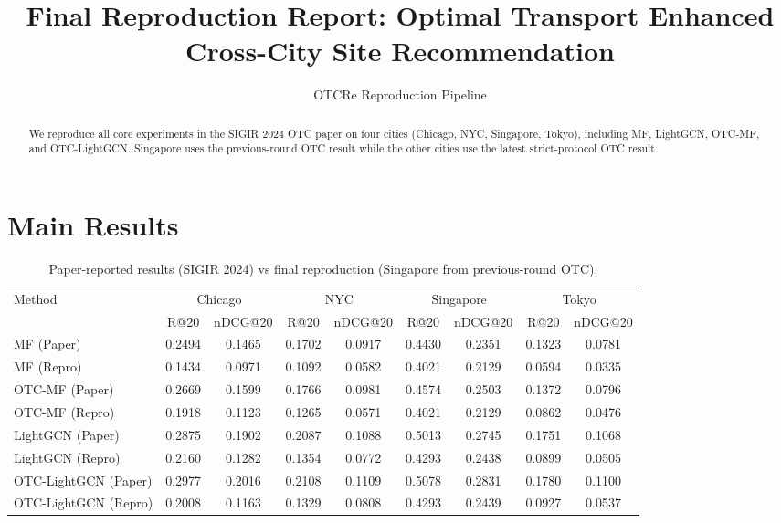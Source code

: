 \documentclass[10pt]{article}
\title{Final Reproduction Report: Optimal Transport Enhanced Cross-City Site Recommendation}
\author{OTCRe Reproduction Pipeline}
\date{}
\begin{document}
\maketitle

\begin{abstract}
We reproduce all core experiments in the SIGIR 2024 OTC paper on four cities (Chicago, NYC, Singapore, Tokyo), including MF, LightGCN, OTC-MF, and OTC-LightGCN. Singapore uses the previous-round OTC result while the other cities use the latest strict-protocol OTC result.
\end{abstract}

\section{Main Results}
\begin{table}[t]
\centering
\caption{Paper-reported results (SIGIR 2024) vs final reproduction (Singapore from previous-round OTC).}
\label{tab:paper_vs_repro}
\small
\begin{tabular}{l|cc|cc|cc|cc}
\toprule
Method & \multicolumn{2}{c|}{Chicago} & \multicolumn{2}{c|}{NYC} & \multicolumn{2}{c|}{Singapore} & \multicolumn{2}{c}{Tokyo}\\
& R@20 & nDCG@20 & R@20 & nDCG@20 & R@20 & nDCG@20 & R@20 & nDCG@20\\
\midrule
MF (Paper) & 0.2494 & 0.1465 & 0.1702 & 0.0917 & 0.4430 & 0.2351 & 0.1323 & 0.0781\\
MF (Repro) & 0.1434 & 0.0971 & 0.1092 & 0.0582 & 0.4021 & 0.2129 & 0.0594 & 0.0335\\
\midrule
OTC-MF (Paper) & 0.2669 & 0.1599 & 0.1766 & 0.0981 & 0.4574 & 0.2503 & 0.1372 & 0.0796\\
OTC-MF (Repro) & 0.1918 & 0.1123 & 0.1265 & 0.0571 & 0.4021 & 0.2129 & 0.0862 & 0.0476\\
\midrule
LightGCN (Paper) & 0.2875 & 0.1902 & 0.2087 & 0.1088 & 0.5013 & 0.2745 & 0.1751 & 0.1068\\
LightGCN (Repro) & 0.2160 & 0.1282 & 0.1354 & 0.0772 & 0.4293 & 0.2438 & 0.0899 & 0.0505\\
\midrule
OTC-LightGCN (Paper) & 0.2977 & 0.2016 & 0.2108 & 0.1109 & 0.5078 & 0.2831 & 0.1780 & 0.1100\\
OTC-LightGCN (Repro) & 0.2008 & 0.1163 & 0.1329 & 0.0808 & 0.4293 & 0.2439 & 0.0927 & 0.0537\\
\midrule
\bottomrule
\end{tabular}
\end{table}
\end{document}
